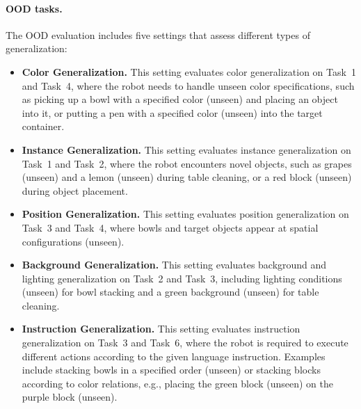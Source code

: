 \documentclass{llmxive}
\begin{document}
\paragraph{OOD tasks.}
The OOD evaluation includes five settings that assess different types of generalization:
\begin{itemize}[leftmargin=*,itemsep=2pt]
    \item \textbf{Color Generalization.} This setting evaluates color generalization on Task~1 and Task~4, where the robot needs to handle unseen color specifications, such as picking up a bowl with a specified color (unseen) and placing an object into it, or putting a pen with a specified color (unseen) into the target container.
    
    \item \textbf{Instance Generalization.} This setting evaluates instance generalization on Task~1 and Task~2, where the robot encounters novel objects, such as grapes (unseen) and a lemon (unseen) during table cleaning, or a red block (unseen) during object placement.
    
    \item \textbf{Position Generalization.} This setting evaluates position generalization on Task~3 and Task~4, where bowls and target objects appear at spatial configurations (unseen).
    
    \item \textbf{Background Generalization.} This setting evaluates background and lighting generalization on Task~2 and Task~3, including lighting conditions (unseen) for bowl stacking and a green background (unseen) for table cleaning.
    
    \item \textbf{Instruction Generalization.} This setting evaluates instruction generalization on Task~3 and Task~6, where the robot is required to execute different actions according to the given language instruction. Examples include stacking bowls in a specified order (unseen) or stacking blocks according to color relations, e.g., placing the green block (unseen) on the purple block (unseen).
\end{itemize}
\end{document}
